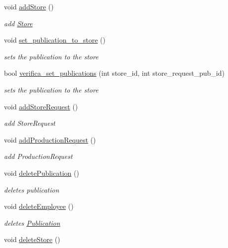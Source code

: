 \begin{DoxyCompactItemize}
void \hyperlink{class_headquarters_ab0fa0fad9679f2f99811257d5a49f4c0}{add\+Store} ()
\begin{DoxyCompactList}\small\item\em add \hyperlink{class_store}{Store} \end{DoxyCompactList}\item 
void \hyperlink{class_headquarters_ae1b2bc854e26b7334169c0bece506646}{set\+\_\+publication\+\_\+to\+\_\+store} ()
\begin{DoxyCompactList}\small\item\em sets the publication to the store \end{DoxyCompactList}\item 
bool \hyperlink{class_headquarters_ab7df8d8638c00305dcaa5593a7dd55ff}{verifica\+\_\+set\+\_\+publications} (int store\+\_\+id, int store\+\_\+request\+\_\+pub\+\_\+id)
\begin{DoxyCompactList}\small\item\em sets the publication to the store \end{DoxyCompactList}\item 
void \hyperlink{class_headquarters_a260cfd15b81cd073a2b597ac892a2142}{add\+Store\+Request} ()
\begin{DoxyCompactList}\small\item\em add Store\+Request \end{DoxyCompactList}\item 
void \hyperlink{class_headquarters_acc151cbc13eaee84fdd6ac8d2bdf83bb}{add\+Production\+Request} ()
\begin{DoxyCompactList}\small\item\em add Production\+Request \end{DoxyCompactList}\item 
void \hyperlink{class_headquarters_a53dc212f35caf7e89661c0dfa000858f}{delete\+Publication} ()
\begin{DoxyCompactList}\small\item\em deletes publication \end{DoxyCompactList}\item 
void \hyperlink{class_headquarters_acf608a712eb8c756149f21ab1d6b38f5}{delete\+Employee} ()
\begin{DoxyCompactList}\small\item\em deletes \hyperlink{class_publication}{Publication} \end{DoxyCompactList}\item 
void \hyperlink{class_headquarters_a39ceab5aab4576d7d082dd6e3c3cb2b5}{delete\+Store} ()

\end{DoxyCompactItemize}
